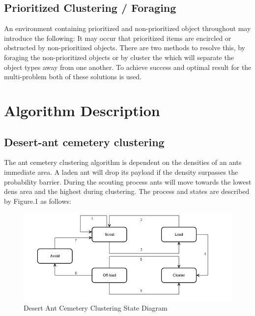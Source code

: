 \documentclass[12pt]{article}
\begin{document}
\subsection{Prioritized Clustering / Foraging}

\par{An environment containing prioritized and non-prioritized object throughout may introduce the following: It may occur that prioritized items are encircled or obstructed by non-prioritized objects. There are two methods to resolve this, by foraging the non-prioritized objects or by cluster the which will separate the object types away from one another. To achieve success and optimal result for the multi-problem both of these solutions is used.}

\section{Algorithm Description}

\subsection{Desert-ant cemetery clustering}

\par{The ant cemetery clustering algorithm is dependent on the densities of an ants immediate area. A laden ant will  drop its payload if the density surpasses the probability barrier. During the scouting process ants will move towards the lowest dens area and the highest during clustering. The process and states are described by Figure.1 as follows:}
\\
\begin{figure}[h]
\includegraphics[width=\textwidth]{desertant.png}
\centering
\caption{Desert Ant Cemetery Clustering State Diagram}
\label{fig:desertamtState}
\end{figure}
\end{document}
